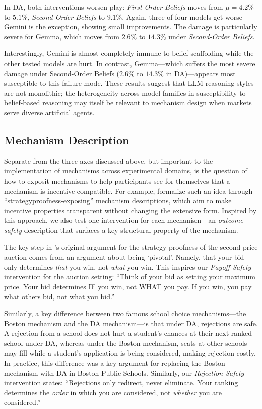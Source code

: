 \documentclass[format=acmsmall, review=false]{acmart}
\begin{document}
In DA, both interventions worsen play: \textit{First-Order Beliefs }moves from $\mu = 4.2\%$ to $5.1\%$, \textit{Second-Order Beliefs }to $9.1\%$. Again, three of four models get worse---Gemini is the exception, showing small improvements. The damage is particularly severe for Gemma, which moves from $2.6\%$ to $14.3\%$ under \textit{Second-Order Beliefs}.

Interestingly, Gemini is almost completely immune to belief scaffolding while the other tested models are hurt. In contrast, Gemma---which suffers the most severe damage under Second-Order Beliefs ($2.6\%$ to $14.3\%$ in DA)---appears most susceptible to this
failure mode. These results suggest that LLM reasoning styles are not monolithic; the heterogeneity across model families in susceptibility to belief-based reasoning may itself be relevant to mechanism design when markets serve diverse artificial agents.

\subsection{Mechanism Description} \label{sec:mech-description}

Separate from the three axes discussed above, but important to the implementation of mechanisms across experimental domains, is the question of how to exposit mechanisms to help participants see for themselves that a mechanism is incentive-compatible. For example, \citet{gonczarowski2023strategyproofness} formalize such an idea through ``strategyproofness-exposing'' mechanism descriptions, which aim to make incentive properties transparent without changing the extensive form. Inspired by this approach, we also test one intervention for each mechanism---an \emph{outcome safety} description that surfaces a key structural property of the mechanism.

The key step in \citet{vickrey1961counterspeculation}'s original argument for the strategy-proofness of the second-price auction comes from an argument about being `pivotal'. Namely, that your bid only determines \textit{that }you win, not \textit{what} you win. This inspires our \emph{Payoff Safety} intervention for the auction setting: ``Think of your bid as setting your maximum price. Your bid determines IF you win, not WHAT you pay. If you win, you pay what others bid, not what you bid.''

Similarly, a key difference between two famous school choice mechanisms---the Boston mechanism \citep{abdulkadirouglu2003school} and the DA mechanism---is that under DA, rejections are safe. A rejection from a school does not hurt a student's chances at their next-ranked school under DA, whereas under the Boston mechanism, seats at other schools may fill while a student's application is being considered, making rejection costly. In practice, this difference was a key argument for replacing the Boston mechanism with DA in Boston Public Schools. Similarly, our \emph{Rejection Safety} intervention states: ``Rejections only redirect, never eliminate. Your ranking determines the \emph{order} in which you are considered, not \emph{whether} you are considered.''
\end{document}
